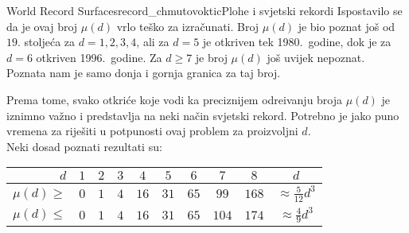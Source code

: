 \begin{surferIntroPage}{World Record Surfaces}{record_chmutovoktic}{Plohe i svjetski rekordi}
Ispostavilo se da je ovaj broj $\mu(d)$ vrlo te\v sko za izra\v cunati.
		Broj $\mu(d)$ je bio poznat jo\v s od $19.$ stolje\' ca za $d=1,2,3,4$, ali za $d=5$ je otkriven tek 1980.\ godine, dok je za $d=6$ otkriven 1996.\ godine.
		Za $d\ge 7$ je broj $\mu(d)$ jo\v s uvijek nepoznat. Poznata nam je samo donja i gornja granica 
		za taj broj.
		
		Prema tome, svako otkri\' ce koje vodi ka preciznijem odre\dj ivanju broja $\mu(d)$ je iznimno va\v zno i predstavlja na neki na\v cin svjetski rekord. Potrebno je jako puno vremena za rije\v siti u potpunosti ovaj problem za proizvoljni $d$.\\ Neki dosad poznati rezultati su:
		
		\begin{center}
      \begin{tabular}{r|cccccccc|c}
        $d$ & $1$ & $2$ & $3$ & $4$ & $5$ & $6$ & $7$ & $8$ & $d$\\
        \hline
        \hline
        \rule{0pt}{1.2em}$\mu(d)\ge$ & $0$ & $1$ & $4$ & $16$ & $31$ & $65$ &
        $99$ & $168$ & 
        $\approx \frac{5}{12}d^3$\\[0.3em]
        \hline
        \rule{0pt}{1.2em}$\mu(d)\le$ & $0$ & $1$ & $4$ & $16$ & $31$ & $65$ &
        $104$ & $174$ & $\approx \frac{4}{9}d^3$
      \end{tabular}
    \end{center}
\end{surferIntroPage}
